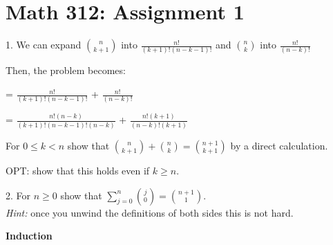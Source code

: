 \documentclass{amsart}
\newenvironment{lyxlist}[1]
{\begin{list}{}
{\settowidth{\labelwidth}{#1}
 \setlength{\leftmargin}{\labelwidth}
 \addtolength{\leftmargin}{\labelsep}
 \renewcommand{\makelabel}[1]{##1\hfil}}}
{\end{list}}
\theoremstyle{remark}
\begin{document}
\section*{Math 312: Assignment 1}

\begin{lyxlist}{10.}
\item [{1.}]
We can expand $\binom{n}{k+1}$ into $\frac{n!}{(k+1)!(n-k-1)!}$ and $\binom{n}{k}$ into $\frac{n!}{(n-k)!}$

Then, the problem becomes:

= $\frac{n!}{(k+1)!(n-k-1)!}$ + $\frac{n!}{(n-k)!}$

= $\frac{n!(n-k)}{(k+1)!(n-k-1)!(n-k)}$ + $\frac{n!(k+1)}{(n-k)!(k+1)}$

For $0\leq k<n$ show that $\binom{n}{k+1}+\binom{n}{k}=\binom{n+1}{k+1}$
by a direct calculation.

\begin{lyxlist}{10.}
\item [{OPT:}] show that this holds even if $k\geq n$. \bigskip{}

\end{lyxlist}
\item [{2.}] For $n\geq0$ show that $\sum_{j=0}^{n}\binom{j}{0}=\binom{n+1}{1}$.\\
\emph{Hint:} once you unwind the definitions of both sides this is
not hard. \bigskip{}

\end{lyxlist}
\begin{center}
\textbf{Induction}
\par\end{center}
\end{document}
